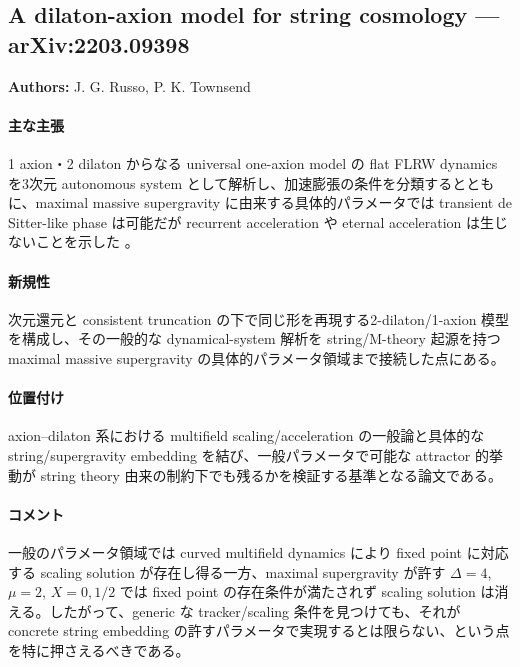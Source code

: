\subsection{A dilaton-axion model for string cosmology --- arXiv:2203.09398}

\textbf{Authors:} J. G. Russo, P. K. Townsend

\paragraph{主な主張}
1 axion・2 dilaton からなる universal one-axion model の flat FLRW dynamics を3次元 autonomous system として解析し、加速膨張の条件を分類するとともに、maximal massive supergravity に由来する具体的パラメータでは transient de Sitter-like phase は可能だが recurrent acceleration や eternal acceleration は生じないことを示した \cite{Russo:2022dilatonaxion}。

\paragraph{新規性}
次元還元と consistent truncation の下で同じ形を再現する2-dilaton/1-axion 模型を構成し、その一般的な dynamical-system 解析を string/M-theory 起源を持つ maximal massive supergravity の具体的パラメータ領域まで接続した点にある。

\paragraph{位置付け}
axion--dilaton 系における multifield scaling/acceleration の一般論と具体的な string/supergravity embedding を結び、一般パラメータで可能な attractor 的挙動が string theory 由来の制約下でも残るかを検証する基準となる論文である。

\paragraph{コメント}
一般のパラメータ領域では curved multifield dynamics により fixed point に対応する scaling solution が存在し得る一方、maximal supergravity が許す $\Delta=4$, $\mu=2$, $X=0,1/2$ では fixed point の存在条件が満たされず scaling solution は消える。したがって、generic な tracker/scaling 条件を見つけても、それが concrete string embedding の許すパラメータで実現するとは限らない、という点を特に押さえるべきである。

